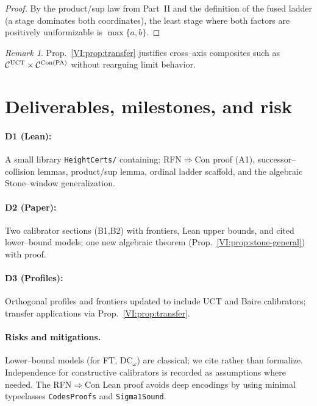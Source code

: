 \documentclass[11pt]{article}
\theoremstyle{definition}
\theoremstyle{remark}
\newtheorem{remark}[theorem]{Remark}
\newcommand{\DCw}{\mathrm{DC}_\omega}
\begin{document}
\begin{proof}
By the product/sup law from Part~II and the definition of the fused ladder (a stage dominates both coordinates), the least stage where both factors are positively uniformizable is \(\max\{a,b\}\).
\end{proof}

\begin{remark}
Prop.~\ref{VI:prop:transfer} justifies cross–axis composites such as \(\mathcal C^{\mathrm{UCT}}\times \mathcal C^{\mathrm{Con}(\mathrm{PA})}\) without rearguing limit behavior.
\end{remark}

\section{Deliverables, milestones, and risk}

\paragraph{D1 (Lean):} A small library \texttt{HeightCerts/} containing:
RFN\(\Rightarrow\)Con proof (A1), successor–collision lemmas, product/sup lemma, ordinal ladder scaffold, and the algebraic Stone–window generalization.

\paragraph{D2 (Paper):} Two calibrator sections (B1,B2) with frontiers, Lean upper bounds, and cited lower–bound models; one new algebraic theorem (Prop.~\ref{VI:prop:stone-general}) with proof.

\paragraph{D3 (Profiles):} Orthogonal profiles and frontiers updated to include UCT and Baire calibrators; transfer applications via Prop.~\ref{VI:prop:transfer}.

\paragraph{Risks and mitigations.}
Lower–bound models (for FT, \(\DCw\)) are classical; we cite rather than formalize. Independence for constructive calibrators is recorded as assumptions where needed. The RFN\(\Rightarrow\)Con Lean proof avoids deep encodings by using minimal typeclasses \texttt{CodesProofs} and \texttt{Sigma1Sound}.
\end{document}
